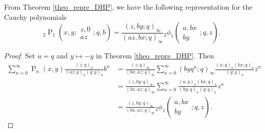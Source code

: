 \documentclass{cimart}
\DeclareMathOperator{\opP}{P}
\begin{document}
\begin{corollary}\label{coro11}
From  Theorem \ref{theo_repre_DHP}, we have the following representation for the Cauchy polynomials
    \begin{equation}
        {}_{2}\opP_{1}\left(x,y;
        \begin{array}{c}
             z,0 \\
             az
        \end{array};
        q,b
        \right)=\frac{(z,by;q)_{\infty}}{(az,bx;q)_{\infty}}{}_{2}\phi_{1}\left(
        \begin{array}{c}
             a,bx\\
             by
        \end{array};
        q, z
        \right).
    \end{equation}
\end{corollary}
\begin{proof}
Set $u=q$ and $y\mapsto-y$ in Theorem \ref{theo_repre_DHP}. Then
    \begin{align*}
        \sum_{n=0}^{\infty}\opP_{n}(x,y)\frac{(z;q)_{n}}{(az;q)_{n}(q;q)_{n}}b^n&=\frac{(z;q)_{\infty}}{(bx,az;q)_{\infty}}\sum_{n=0}^{\infty}(byq^n;q)_{\infty}\frac{(a;q)_{n}(bx;q)_{n}}{(q;q)_{n}}z^n\\
        &=\frac{(z,by;q)_{\infty}}{(bx,az;q)_{\infty}}\sum_{n=0}^{\infty}\frac{(a;q)_{n}(bx;q)_{n}}{(by;q)_{n}(q;q)_{n}}z^n\\
        &=\frac{(z,by;q)_{\infty}}{(bx,az;q)_{\infty}}{}_{2}\phi_{1}\left(
        \begin{array}{c}
             a,bx\\
             by
        \end{array};
        q, z
        \right).
    \end{align*}
\end{proof}
\end{document}
